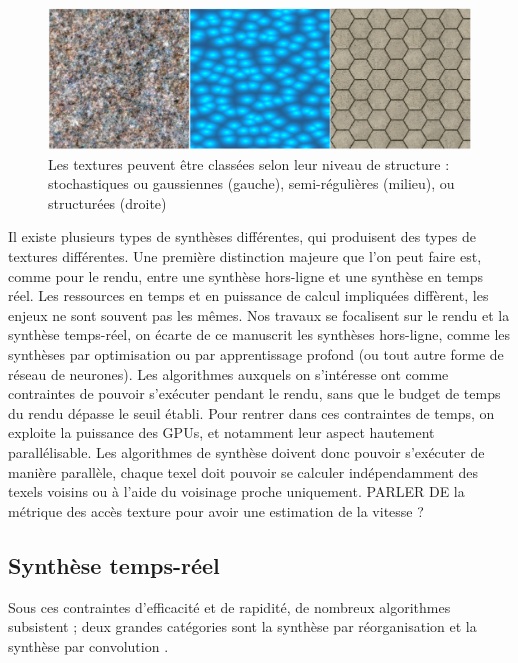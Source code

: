 \begin{figure}[H]
    \centering
    \includegraphics[width=\textwidth]{contenu/resources/images/structure_scale}
    \caption[Classification des textures selon leur niveau de structure]{Les textures peuvent être classées selon leur niveau de structure : stochastiques ou gaussiennes (gauche), semi-régulières (milieu), ou structurées (droite)}
    \label{fig:échelle-structure}
\end{figure}

Il existe plusieurs types de synthèses différentes, qui produisent des types de textures différentes. Une première distinction majeure que l'on peut faire est, comme pour le rendu, entre une synthèse hors-ligne et une synthèse en temps réel. Les ressources en temps et en puissance de calcul impliquées diffèrent, les enjeux ne sont souvent pas les mêmes. Nos travaux se focalisent sur le rendu et la synthèse temps-réel, on écarte de ce manuscrit les synthèses hors-ligne, comme les synthèses par optimisation ou par apprentissage profond (ou tout autre forme de réseau de neurones). Les algorithmes auxquels on s'intéresse ont comme contraintes de pouvoir s'exécuter pendant le rendu, sans que le budget de temps du rendu dépasse le seuil établi. Pour rentrer dans ces contraintes de temps, on exploite la puissance des GPUs, et notamment leur aspect hautement parallélisable. Les algorithmes de synthèse doivent donc pouvoir s'exécuter de manière parallèle, chaque texel doit pouvoir se calculer indépendamment des texels voisins ou à l'aide du voisinage proche uniquement.
{\color{red}PARLER DE la métrique des accès texture pour avoir une estimation de la vitesse ?}


\subsection*{Synthèse temps-réel} %

Sous ces contraintes d'efficacité et de rapidité, de nombreux algorithmes subsistent ; deux grandes catégories sont la synthèse \og par réorganisation \fg et la synthèse \og par convolution \fg.

